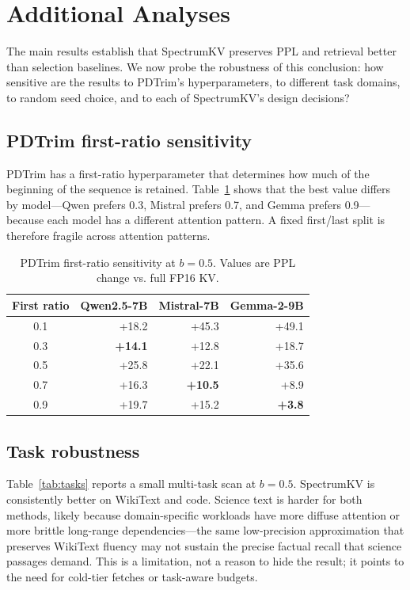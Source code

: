 \documentclass[11pt]{article}
\newcommand{\method}{SpectrumKV}
\newcommand{\budget}{b}
\theoremstyle{plain}
\theoremstyle{definition}
\begin{document}
\section{Additional Analyses}
\label{sec:additional}

The main results establish that \method{} preserves PPL and retrieval better than selection baselines.  We now probe the robustness of this conclusion: how sensitive are the results to PDTrim's hyperparameters, to different task domains, to random seed choice, and to each of \method{}'s design decisions?

\subsection{PDTrim first-ratio sensitivity}
PDTrim has a first-ratio hyperparameter that determines how much of the beginning of the sequence is retained.  Table~\ref{tab:fr} shows that the best value differs by model---Qwen prefers 0.3, Mistral prefers 0.7, and Gemma prefers 0.9---because each model has a different attention pattern.  A fixed first/last split is therefore fragile across attention patterns.

\begin{table}[h]
\centering
\caption{PDTrim first-ratio sensitivity at $\budget=0.5$.  Values are PPL change vs. full FP16 KV.}
\label{tab:fr}
\small
\begin{tabular}{crrr}
\toprule
First ratio & Qwen2.5-7B & Mistral-7B & Gemma-2-9B \\
\midrule
0.1 & +18.2 & +45.3 & +49.1 \\
0.3 & \textbf{+14.1} & +12.8 & +18.7 \\
0.5 & +25.8 & +22.1 & +35.6 \\
0.7 & +16.3 & \textbf{+10.5} & +8.9 \\
0.9 & +19.7 & +15.2 & \textbf{+3.8} \\
\bottomrule
\end{tabular}
\end{table}

\subsection{Task robustness}
Table~\ref{tab:tasks} reports a small multi-task scan at $\budget=0.5$.  \method{} is consistently better on WikiText and code.  Science text is harder for both methods, likely because domain-specific workloads have more diffuse attention or more brittle long-range dependencies---the same low-precision approximation that preserves WikiText fluency may not sustain the precise factual recall that science passages demand.  This is a limitation, not a reason to hide the result; it points to the need for cold-tier fetches or task-aware budgets.
\end{document}
